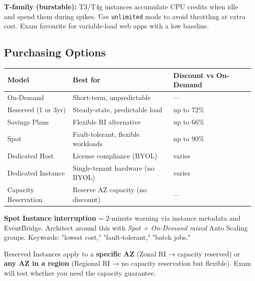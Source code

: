\begin{examtip}
\textbf{T-family (burstable):} T3/T4g instances accumulate CPU credits when idle
and spend them during spikes. Use \texttt{unlimited} mode to avoid throttling
at extra cost. Exam favourite for variable-load web apps with a low baseline.
\end{examtip}

\subsection{Purchasing Options}

\begin{comparebox}[title={Pricing models}]
\begin{tabular}{@{}p{3.2cm}p{5.5cm}p{4cm}@{}}
\toprule
\textbf{Model} & \textbf{Best for} & \textbf{Discount vs On-Demand} \\
\midrule
On-Demand          & Short-term, unpredictable          & —                \\
Reserved (1 or 3yr)& Steady-state, predictable load     & up to 72\%       \\
Savings Plans      & Flexible RI alternative            & up to 66\%       \\
Spot               & Fault-tolerant, flexible workloads & up to 90\%       \\
Dedicated Host     & License compliance (BYOL)          & varies           \\
Dedicated Instance & Single-tenant hardware (no BYOL)   & varies           \\
Capacity Reservation & Reserve AZ capacity (no discount) & —               \\
\bottomrule
\end{tabular}
\end{comparebox}

\begin{examtip}
\textbf{Spot Instance interruption} = 2-minute warning via instance metadata
and EventBridge. Architect around this with \emph{Spot + On-Demand mixed}
Auto Scaling groups. Keywords: "lowest cost," "fault-tolerant," "batch jobs."
\end{examtip}

\begin{gotcha}
Reserved Instances apply to a \textbf{specific AZ} (Zonal RI → capacity reserved)
or \textbf{any AZ in a region} (Regional RI → no capacity reservation but flexible).
Exam will test whether you need the capacity guarantee.
\end{gotcha}

